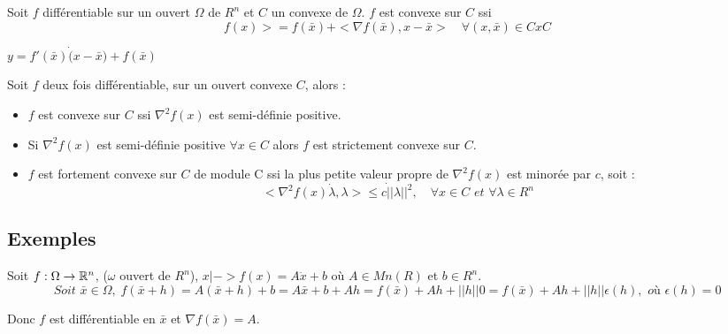 		\begin{theoreme}
		Soit $f$ différentiable sur un ouvert $\Omega$ de $R^n$ et $C$ un convexe de $\Omega$.
		$f$ est convexe sur $C$ ssi \[f(x) >= f(\bar{x}) + <\nabla f(\bar{x}), x-\bar{x}> \quad\forall (x, \bar{x}) \in C x C\]
		\end{theoreme}
		
		$y=f'(\bar{x}) \dot (x-\bar{x}) +f(\bar{x})$
		
		\begin{theoreme}
		Soit $f$ deux fois différentiable, sur un ouvert convexe $C$, alors :
		\begin{itemize}
			\item $f$ est convexe sur $C$ ssi $\nabla^2 f(x)$ est semi-définie positive.
			\item Si $\nabla^2 f(x)$ est semi-définie positive $\forall x \in C$ alors $f$ est strictement convexe sur $C$.
			\item $f$ est fortement convexe sur $C$ de module C ssi la plus petite valeur propre de $\nabla^2 f(x)$ est minorée par $c$, soit : \[<\nabla^2 f(x) \dot \lambda, \lambda> \leq c \dot ||\lambda ||^2, \quad\forall x \in C \textit{ et } \forall \lambda \in R^n\]
		\end{itemize}
		\end{theoreme}
		
		
	\subsection{Exemples}
	
		\begin{exemple}
		
		Soit $f:\Omega \rightarrow \mathbb{R}^n$, ($\omega$ ouvert de $R^n$), $x|-> f(x) = A \dot x +b$ où $A \in Mn(R)$ et $b \in R^n$.
		\[\textit{Soit }\bar{x} \in \Omega, \; f(\bar{x} +h) = A (\bar{x}+h) + b = A \bar{x} + b + Ah = f(\bar{x}) + Ah + ||h|| 0 = f(\bar{x}) + Ah + ||h|| \epsilon (h), \textit{ où } \epsilon (h) = 0\]
		
		Donc $f$ est différentiable en $\bar{x}$ et $\nabla f(\bar{x}) = A$.
		\end{exemple}
		
